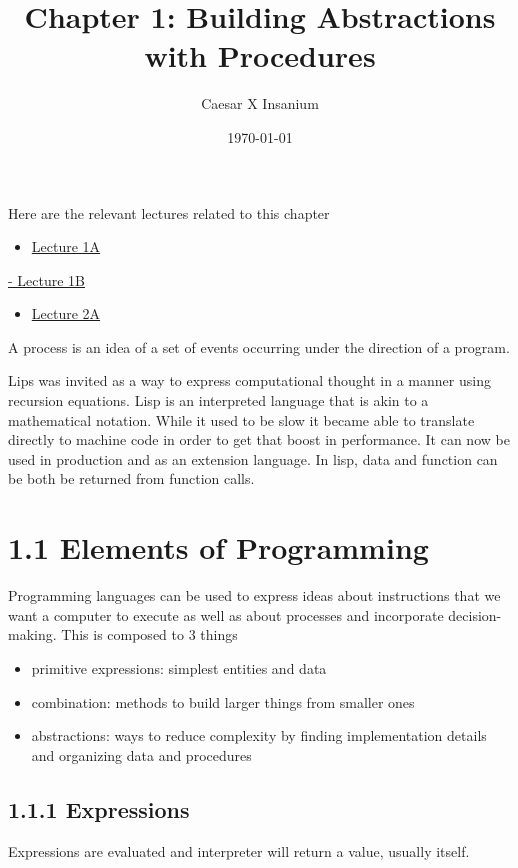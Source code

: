 \documentclass[11pt]{article}
\author{Caesar X Insanium}
\date{\today}
\title{Chapter 1: Building Abstractions with Procedures}
\begin{document}
\maketitle
\tableofcontents

Here are the relevant lectures related to this chapter

\begin{itemize}
\item \href{https://www.youtube.com/watch?v=eJeMOEiHv8c}{Lecture 1A}
\end{itemize}
\href{https://www.youtube.com/watch?v=-J\_xL4IGhJA\&list=PLE18841CABEA24090\&index=1}{- Lecture 1B}
\begin{itemize}
\item \href{https://youtu.be/eJeMOEiHv8c?list=PLE18841CABEA24090}{Lecture 2A}
\end{itemize}

A process is an idea of a set of events occurring under the direction of
a program.

Lips was invited as a way to express computational thought in a manner
using recursion equations. Lisp is an interpreted language that is akin
to a mathematical notation. While it used to be slow it became able to
translate directly to machine code in order to get that boost in
performance. It can now be used in production and as an extension
language. In lisp, data and function can be both be returned from
function calls.

\section{1.1 Elements of Programming}
\label{sec:org5c8b2d9}
Programming languages can be used to express ideas about instructions
that we want a computer to execute as well as about processes and
incorporate decision-making. This is composed to 3 things

\begin{itemize}
\item primitive expressions: simplest entities and data
\item combination: methods to build larger things from smaller ones
\item abstractions: ways to reduce complexity by finding implementation
details and organizing data and procedures
\end{itemize}

\subsection{1.1.1 Expressions}
\label{sec:orge950840}
Expressions are evaluated and interpreter will return a value, usually
itself.
\end{document}
